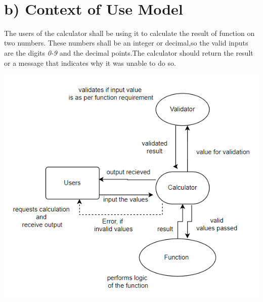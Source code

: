 \documentclass{article}
\begin{document}
\\
\section*{b) Context of Use Model}
\normalsize{The users of the calculator shall be using it to calculate the result of function on two numbers. These numbers shall be an integer or decimal,so the valid inputs are the digits \textit{0-9} and the decimal points.The calculator should return the result or a message that indicates why it was unable to do so.}
\begin{center}
\includegraphics[width=15cm]{context}
\end{center}


\pagebreak
{}
\section*{}
\end{document}
